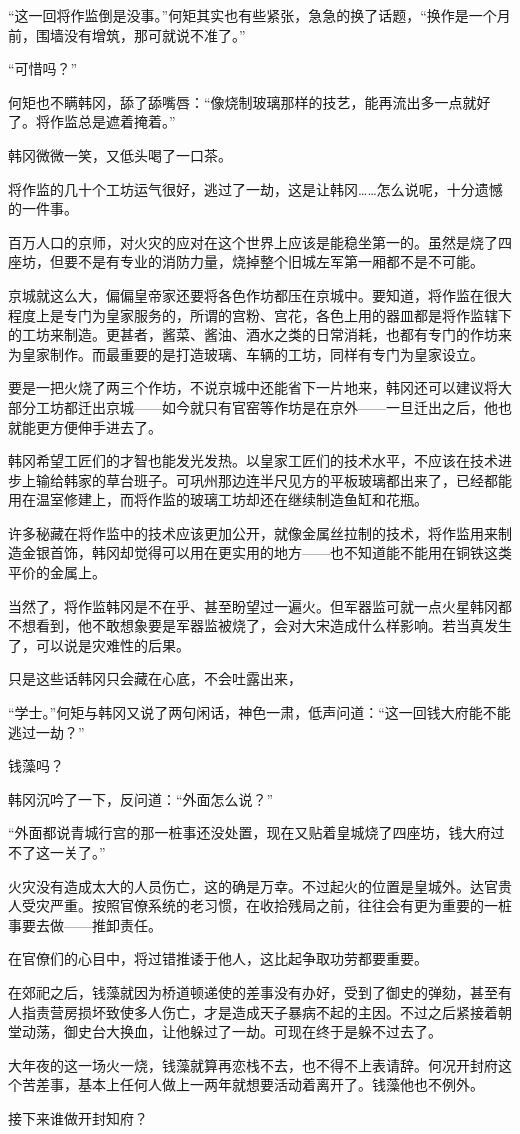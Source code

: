“这一回将作监倒是没事。”何矩其实也有些紧张，急急的换了话题，“换作是一个月前，围墙没有增筑，那可就说不准了。”

“可惜吗？”

何矩也不瞒韩冈，舔了舔嘴唇：“像烧制玻璃那样的技艺，能再流出多一点就好了。将作监总是遮着掩着。”

韩冈微微一笑，又低头喝了一口茶。

将作监的几十个工坊运气很好，逃过了一劫，这是让韩冈……怎么说呢，十分遗憾的一件事。

百万人口的京师，对火灾的应对在这个世界上应该是能稳坐第一的。虽然是烧了四座坊，但要不是有专业的消防力量，烧掉整个旧城左军第一厢都不是不可能。

京城就这么大，偏偏皇帝家还要将各色作坊都压在京城中。要知道，将作监在很大程度上是专门为皇家服务的，所谓的宫粉、宫花，各色上用的器皿都是将作监辖下的工坊来制造。更甚者，酱菜、酱油、酒水之类的日常消耗，也都有专门的作坊来为皇家制作。而最重要的是打造玻璃、车辆的工坊，同样有专门为皇家设立。

要是一把火烧了两三个作坊，不说京城中还能省下一片地来，韩冈还可以建议将大部分工坊都迁出京城——如今就只有官窑等作坊是在京外——一旦迁出之后，他也就能更方便伸手进去了。

韩冈希望工匠们的才智也能发光发热。以皇家工匠们的技术水平，不应该在技术进步上输给韩家的草台班子。可巩州那边连半尺见方的平板玻璃都出来了，已经都能用在温室修建上，而将作监的玻璃工坊却还在继续制造鱼缸和花瓶。

许多秘藏在将作监中的技术应该更加公开，就像金属丝拉制的技术，将作监用来制造金银首饰，韩冈却觉得可以用在更实用的地方——也不知道能不能用在铜铁这类平价的金属上。

当然了，将作监韩冈是不在乎、甚至盼望过一遍火。但军器监可就一点火星韩冈都不想看到，他不敢想象要是军器监被烧了，会对大宋造成什么样影响。若当真发生了，可以说是灾难性的后果。

只是这些话韩冈只会藏在心底，不会吐露出来，

“学士。”何矩与韩冈又说了两句闲话，神色一肃，低声问道：“这一回钱大府能不能逃过一劫？”

钱藻吗？

韩冈沉吟了一下，反问道：“外面怎么说？”

“外面都说青城行宫的那一桩事还没处置，现在又贴着皇城烧了四座坊，钱大府过不了这一关了。”

火灾没有造成太大的人员伤亡，这的确是万幸。不过起火的位置是皇城外。达官贵人受灾严重。按照官僚系统的老习惯，在收拾残局之前，往往会有更为重要的一桩事要去做——推卸责任。

在官僚们的心目中，将过错推诿于他人，这比起争取功劳都要重要。

在郊祀之后，钱藻就因为桥道顿递使的差事没有办好，受到了御史的弹劾，甚至有人指责营房损坏致使多人伤亡，才是造成天子暴病不起的主因。不过之后紧接着朝堂动荡，御史台大换血，让他躲过了一劫。可现在终于是躲不过去了。

大年夜的这一场火一烧，钱藻就算再恋栈不去，也不得不上表请辞。何况开封府这个苦差事，基本上任何人做上一两年就想要活动着离开了。钱藻他也不例外。

接下来谁做开封知府？
